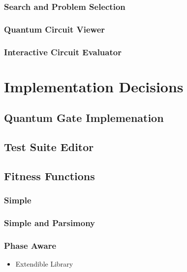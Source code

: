 \documentclass[authoryearcitations]{UoYCSproject}
\begin{document}
\subsection{Search and Problem Selection}

\subsection{Quantum Circuit Viewer}

\subsection{Interactive Circuit Evaluator}

\chapter{Implementation Decisions}

\section{Quantum Gate Implemenation}

\section{Test Suite Editor}


\section{Fitness Functions}

\subsection{Simple}

\subsection{Simple and Parsimony}

\subsection{Phase Aware}

\begin{itemize}
 \item Extendible Library
\end{itemize}



\end{document}
